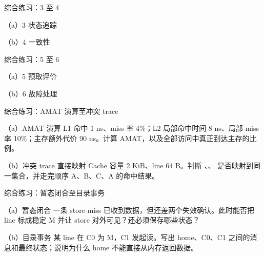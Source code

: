 \begin{chapterexercise}{综合练习：3 至 4}
\begin{exercisesubproblem}{（a）3}
状态追踪
\end{exercisesubproblem}
\begin{exercisesubproblem}{（b）4}
一致性
\end{exercisesubproblem}
\end{chapterexercise}

\begin{chapterexercise}{综合练习：5 至 6}
\begin{exercisesubproblem}{（a）5}
预取评价
\end{exercisesubproblem}
\begin{exercisesubproblem}{（b）6}
故障处理
\end{exercisesubproblem}
\end{chapterexercise}

\begin{chapterexercise}{综合练习：AMAT 演算至冲突 trace}
\begin{exercisesubproblem}{（a）AMAT 演算}
L1 命中 1 ns、miss 率 4\%；L2 局部命中时间 8 ns、局部 miss 率 10\%；主存额外代价 90 ns。计算 AMAT，以及全部访问中真正到达主存的比例。
\end{exercisesubproblem}
\begin{exercisesubproblem}{（b）冲突 trace}
直接映射 Cache 容量 2 KiB、line 64 B。判断 、、 是否映射到同一集合，并走完顺序 A、B、C、A 的命中结果。
\end{exercisesubproblem}
\end{chapterexercise}

\begin{chapterexercise}{综合练习：暂态闭合至目录事务}
\begin{exercisesubproblem}{（a）暂态闭合}
一条 store miss 已收到数据，但还差两个失效确认。此时能否把 line 标成稳定 M 并让 store 对外可见？还必须保存哪些状态？
\end{exercisesubproblem}
\begin{exercisesubproblem}{（b）目录事务}
某 line 在 C0 为 M，C1 发起读。写出 home、C0、C1 之间的消息和最终状态；说明为什么 home 不能直接从内存返回数据。
\end{exercisesubproblem}
\end{chapterexercise}

